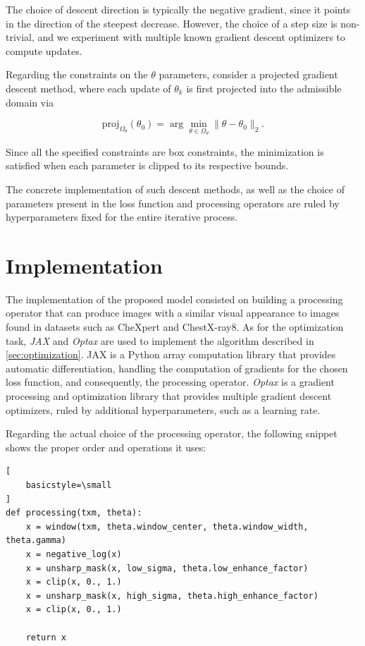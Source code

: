 \documentclass[nomenclature, english, bibtex]{kththesis}
\numberwithin{listing}{chapter}
\begin{document}
The choice of descent direction is typically the negative gradient, since it points in the direction of the steepest
decrease. However, the choice of a step size is non-trivial, and we experiment with multiple known gradient descent
optimizers to compute updates.

Regarding the constraints on the $\theta$ parameters, consider a projected gradient descent method, where
each update of  $\theta_k$ is first projected into the admissible domain via

\begin{equation}
    \mathrm{proj}_{\Omega_\theta}(\theta_0) = \arg\min_{\theta \in \Omega_\theta} \lVert \theta - \theta_0 \rVert_2.
\end{equation}

Since all the specified constraints are box constraints, the minimization is satisfied when each parameter is
clipped to its respective bounds.

The concrete implementation of such descent methods, as well as the choice of parameters present in the loss function
and processing operators are ruled by hyperparameters fixed for the entire iterative process.

\chapter{Implementation}

The implementation of the proposed model consisted on building a processing operator that can produce images with a similar
visual appearance to images found in datasets such as CheXpert and ChestX-ray8. As for the optimization task,
\textit{JAX} \cite{jax2018github} and \textit{Optax} \cite{deepmind2020jax} are used to implement the
algorithm described in \autoref{sec:optimization}. JAX is a Python array computation library that provides automatic
differentiation, handling the computation of gradients for the chosen loss function, and consequently, the processing
operator. \textit{Optax} is a gradient processing and optimization library that provides multiple gradient descent optimizers, ruled
by additional hyperparameters, such as a learning rate.

Regarding the actual choice of the processing operator, the following snippet shows the proper order and operations
it uses:

\begin{lstlisting}[
    basicstyle=\small
]
def processing(txm, theta):
    x = window(txm, theta.window_center, theta.window_width, theta.gamma)
    x = negative_log(x)
    x = unsharp_mask(x, low_sigma, theta.low_enhance_factor)
    x = clip(x, 0., 1.)
    x = unsharp_mask(x, high_sigma, theta.high_enhance_factor)
    x = clip(x, 0., 1.)

    return x
\end{lstlisting}
\end{document}

